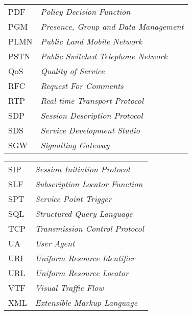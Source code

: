 \begin{tabular}{p{2cm}l}
PDF & \emph{Policy Decision Function} \\
PGM & \emph{Presence, Group and Data Management} \\
PLMN & \emph{Public Land Mobile Network} \\
PSTN & \emph{Public Switched Telephone Network} \\
QoS & \emph{Quality of Service} \\
RFC & \emph{Request For Comments} \\
RTP & \emph{Real-time Transport Protocol} \\
SDP & \emph{Session Description Protocol} \\
SDS & \emph{Service Development Studio} \\
SGW & \emph{Signalling Gateway} \\
\end{tabular}

\begin{tabular}{p{2cm}l}
SIP & \emph{Session Initiation Protocol} \\
SLF & \emph{Subscription Locator Function} \\
SPT & \emph{Service Point Trigger} \\
SQL & \emph{Structured Query Language} \\
TCP & \emph{Transmission Control Protocol} \\
UA & \emph{User Agent} \\
URI & \emph{Uniform Resource Identifier} \\
URL & \emph{Uniform Resource Locator} \\
VTF & \emph{Visual Traffic Flow} \\
XML & \emph{Extensible Markup Language} \\
\end{tabular}
